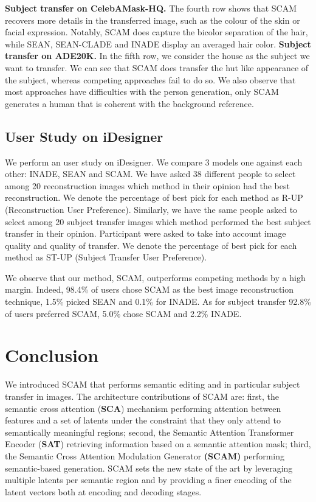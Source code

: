 \documentclass[runningheads]{llncs}
\makeatletter
\newcommand{\mname}{SCAM\@\xspace}
\makeatother
\begin{document}
\noindent \textbf{Subject transfer on CelebAMask-HQ.} The fourth row shows that \mname recovers more details in the transferred image, such as the colour of the skin or facial expression. Notably, \mname does capture the bicolor separation of the hair, while SEAN, SEAN-CLADE and INADE display an averaged hair color. 
\noindent \textbf{Subject transfer on ADE20K.} In the fifth row, we consider the house as the subject we want to transfer. We can see that SCAM does transfer the hut like appearance of the subject, whereas competing approaches fail to do so. We also observe that most approaches have difficulties with the person generation, only \mname generates a human that is coherent with the background reference.

\subsection{User Study on iDesigner}
We perform an user study on iDesigner. We compare 3 models one against each other: INADE, SEAN and SCAM. We have asked 38 different people to select among 20 reconstruction images which method in their opinion had the best reconstruction. We denote the percentage of best pick for each method as R-UP (Reconstruction User Preference). Similarly, we have the same people asked to select among 20 subject transfer images which method performed the best subject transfer in their opinion. Participant were asked to take into account image quality and quality of transfer. We denote the percentage of best pick for each method as ST-UP (Subject Transfer User Preference).


\noindent We observe that our method, SCAM, outperforms competing methods by a high margin. Indeed, 98.4\% of users chose SCAM as the best image reconstruction technique, 1.5\% picked SEAN and 0.1\% for INADE. As for subject transfer 92.8\% of users preferred SCAM, 5.0\% chose SCAM and 2.2\% INADE.




 \section{Conclusion}
\label{sec:conclusion}
We introduced \mname that performs semantic editing and in particular subject transfer in images. The architecture contributions of \mname are: 
first, the semantic cross attention (\textbf{SCA}) mechanism  performing attention between features and a set of latents under the constraint that they only attend to semantically meaningful regions; second, the Semantic Attention Transformer Encoder (\textbf{SAT}) retrieving information based on a semantic attention mask; third, the Semantic Cross Attention Modulation Generator \textbf{(SCAM)} performing semantic-based generation. 
\mname sets the new state of the art by leveraging multiple latents per semantic region and by providing a finer encoding of the latent vectors both at encoding and decoding stages.
 
\end{document}
